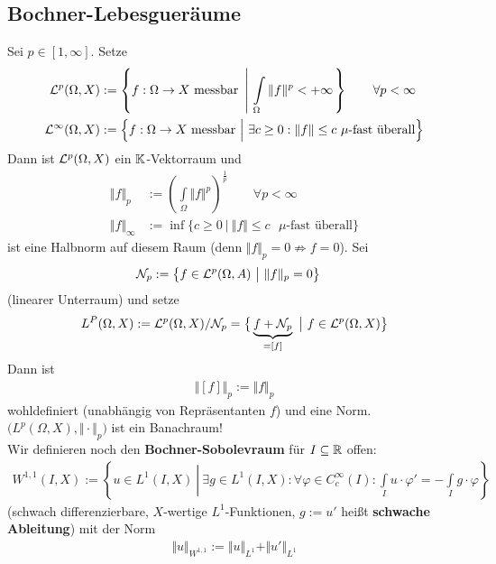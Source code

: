\subsection*{Bochner-Lebesgueräume}
Sei $p\in[1,\infty]$. Setze
\begin{align*}
\mathcal{L}^p(\Omega,X)&:=\left\lbrace f:\Omega\to X\text{ messbar }\left|~\int\limits_\Omega\Vert f\Vert^p<+\infty\right.\right\rbrace\qquad\forall p<\infty\\
\mathcal{L}^\infty(\Omega,X)&:=\Big\lbrace f:\Omega\to X\text{ messbar }\Big|~\exists   c\geq0:\Vert f\Vert\leq c\text{ $\mu$-fast überall}\Big\rbrace
\end{align*}
Dann ist $\mathcal{L}^p(\Omega,X)$ ein $\mathbb{K}$-Vektorraum und 
\begin{align*}
\Vert f\Vert_p&:=\left(\int\limits_\Omega\Vert f\Vert^p\right)^{\frac{1}{p}}\qquad\forall p<\infty\\
\Vert f\Vert_\infty&:=\inf\limits\big\lbrace c\geq 0~\big|~\Vert f\Vert\leq c\text{ $\mu$-fast überall}\big\rbrace
\end{align*}
ist eine Halbnorm auf diesem Raum (denn $\Vert f\Vert_p=0\not\Rightarrow f=0$). Sei
\begin{align*}
\mathcal{N}_p&:=\big\lbrace f\in \mathcal{L}^p(\Omega,A)~\big|~\Vert f\Vert_p=0\big\rbrace
\end{align*}
(linearer Unterraum) und setze
\begin{align*}
L^P(\Omega,X):=\mathcal{L}^p(\Omega,X)/\mathcal{N}_p
=\big\lbrace \underbrace{f+\mathcal{N}_p}_{=[f]}~\big|~f\in\mathcal{L}^p(\Omega,X)\big\rbrace
\end{align*}
Dann ist
\begin{align*}
\big\Vert[f]\big\Vert_p:=\Vert f\Vert_p
\end{align*}
wohldefiniert (unabhängig von Repräsentanten $f$) und eine Norm. $\big(L^p(\Omega,X),\Vert\cdot\Vert_p\big)$ ist ein  Banachraum!\\
Wir definieren noch den \textbf{Bochner-Sobolevraum} für $I\subseteq\mathbb{R}$ offen:
\begin{align*}
W^{1,1}(I,X):=\left\lbrace u\in L^1(I,X)~\left|~\exists g\in L^1(I,X):\forall\varphi\in C_c^\infty(I):\int\limits_I u\cdot\varphi'=-\int\limits_I g\cdot\varphi\right.\right\rbrace
\end{align*}
(schwach differenzierbare, $X$-wertige $L^1$-Funktionen, $g:=u'$ heißt \textbf{schwache Ableitung}) mit der Norm
\begin{align*}
\Vert u\Vert_{W^{1,1}}:=\Vert u\Vert_{L^1}+\Vert u'\Vert_{L^1}
\end{align*}
